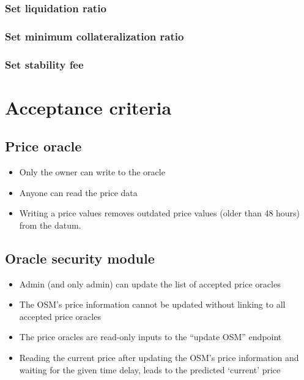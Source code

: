 \documentclass{article} %
\begin{document}
\subsubsection{Set liquidation ratio}

\subsubsection{Set minimum collateralization ratio}

\subsubsection{Set stability fee}

\section{Acceptance criteria}

\subsection{Price oracle}

\begin{itemize}
  \item Only the owner can write to the oracle
  \item Anyone can read the price data
  \item Writing a price values removes outdated price values (older than 48
    hours) from the datum.
\end{itemize}

\subsection{Oracle security module}

\begin{itemize}
  \item Admin (and only admin) can update the list of accepted price oracles
  \item The OSM's price information cannot be updated without linking to all
    accepted price oracles
  \item The price oracles are read-only inputs to the ``update OSM'' endpoint
  \item Reading the current price after updating the OSM's price information and
    waiting for the given time delay, leads to the predicted `current' price
\end{itemize}
\end{document}

